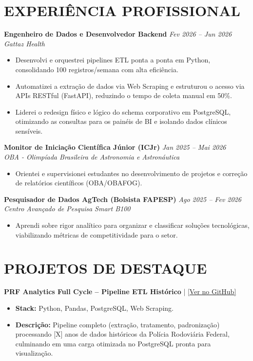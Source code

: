 \documentclass[11pt,a4paper]{article}
\begin{document}
\section*{EXPERIÊNCIA PROFISSIONAL}
\textbf{Engenheiro de Dados e Desenvolvedor Backend} \hfill \textit{Fev 2026 -- Jun 2026} \\
\textit{Gattaz Health} \\
\begin{itemize}
    \item Desenvolvi e orquestrei pipelines ETL ponta a ponta em Python, consolidando 100 registros/semana com alta eficiência.
    \item Automatizei a extração de dados via Web Scraping e estruturou o acesso via APIs RESTful (FastAPI), reduzindo o tempo de coleta manual em 50\%.
    \item Liderei o redesign físico e lógico do schema corporativo em PostgreSQL, otimizando as consultas para os painéis de BI e isolando dados clínicos sensíveis.
\end{itemize}

\vspace{0.2cm}
\textbf{Monitor de Iniciação Científica Júnior (ICJr)} \hfill \textit{Jan 2025 -- Mai 2026} \\
\textit{OBA - Olimpíada Brasileira de Astronomia e Astronáutica} \\
\begin{itemize}
    \item Orientei e supervisionei estudantes no desenvolvimento de projetos e correção de relatórios científicos (OBA/OBAFOG).
\end{itemize}

\vspace{0.2cm}
\textbf{Pesquisador de Dados AgTech (Bolsista FAPESP)} \hfill \textit{Ago 2025 -- Fev 2026} \\
\textit{Centro Avançado de Pesquisa Smart B100} \\
\begin{itemize}
    \item Aprendi sobre rigor analítico para organizar e classificar soluções tecnológicas, viabilizando métricas de competitividade para o setor.
\end{itemize}

\vspace{0.2cm}
\section*{PROJETOS DE DESTAQUE}
\textbf{PRF Analytics Full Cycle -- Pipeline ETL Histórico} | \href{https://github.com/marciomazega}{[Ver no GitHub]}
\begin{itemize}
    \item \textbf{Stack:} Python, Pandas, PostgreSQL, Web Scraping.
    \item \textbf{Descrição:} Pipeline completo (extração, tratamento, padronização) processando [X] anos de dados históricos da Polícia Rodoviária Federal, culminando em uma carga otimizada no PostgreSQL pronta para visualização.
\end{itemize}
\end{document}
